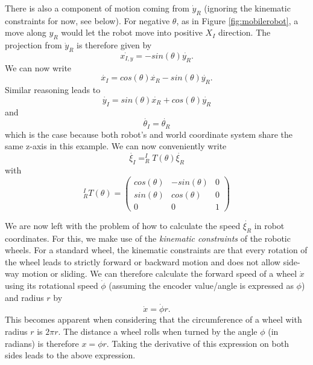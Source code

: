 There is also a component of motion coming from $ \dot{y}_R$ (ignoring the kinematic constraints for now, see below).  For negative $ \theta$, as in Figure \ref{fig:mobilerobot}, a move along $y_R$ would let the robot move into positive $ X_I$ direction. The projection from $ \dot{y}_R$ is therefore given by 
\begin{equation}
\dot{x_{I,y}}=-sin(\theta)\dot{y_R}.
\end{equation} 
We can now write
\begin{equation}
\dot{x_I}=cos(\theta) \dot{x_R} - sin(\theta) \dot{y_R}.
\end{equation}
Similar reasoning leads to
\begin{equation}
\dot{y_I}=sin(\theta) \dot{x_R} + cos(\theta) \dot{y_R}
\end{equation}
and
\begin{equation}
\dot{\theta_I}=\dot{\theta_R}
\end{equation}
which is the case because both robot's and world coordinate system share the same z-axis in this example. We can now conveniently write
\begin{equation}
\dot{\xi_I}=^I_RT(\theta)\dot{\xi_R}
\end{equation}
with
\begin{equation}
^I_RT(\theta)=\left(\begin{array}{ccc}
cos(\theta) & -sin(\theta) & 0 \\
sin(\theta) & cos(\theta) & 0 \\
0 & 0 & 1\end{array}\right)
\end{equation}

We are now left with the problem of how to calculate the speed $ \dot{\xi_R}$ in robot coordinates. For this, we make use of the \emph{kinematic constraints} of the robotic wheels. For a standard wheel, the kinematic constraints are that every rotation of the wheel leads to strictly forward or backward motion and does not allow side-way motion or sliding. We can therefore calculate the forward speed of a wheel $ \dot{x}$ using its rotational speed $ \dot{\phi}$ (assuming the encoder value/angle is expressed as $ \phi$) and radius $ r$ by 
\begin{equation}
\dot{x}=\dot{\phi}r.
\end{equation}
This becomes apparent when considering that the circumference of a wheel with radius $ r$ is $ 2\pi r$. The distance a wheel rolls when turned by the angle $ \phi$ (in radians) is therefore $ x=\phi r$. Taking the derivative of this expression on both sides leads to the above expression.

